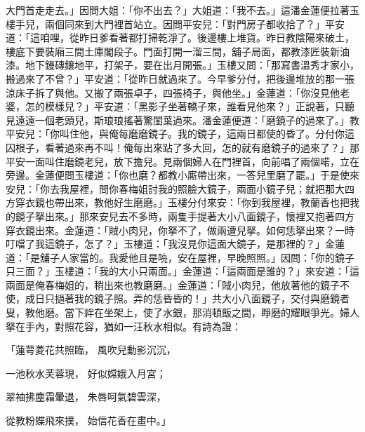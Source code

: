 大門首走走去。」因問大姐：「你不出去？」大姐道：「我不去。」這潘金蓮便拉著玉樓手兒，兩個同來到大門裡首站立。因問平安兒：「對門房子都收拾了？」平安道：「這咱哩，從昨日爹看著都打掃乾淨了。後邊樓上堆貨。昨日教陰陽來破土，樓底下要裝廂三間土庫閣段子。門面打開一溜三間，舖子局面，都教漆匠裝新油漆。地下鏝磚鑲地平，打架子，要在出月開張。」玉樓又問：「那寫書溫秀才家小，搬過來了不曾？」平安道：「從昨日就過來了。今早爹分付，把後邊堆放的那一張涼床子拆了與他。又搬了兩張卓子，四張椅子，與他坐。」金蓮道：「你沒見他老婆，怎的模樣兒？」平安道：「黑影子坐著轎子來，誰看見他來？」正說著，只聽見遠遠一個老頭兒，斯琅琅搖著驚閨葉過來。潘金蓮便道：「磨鏡子的過來了。」教平安兒：「你叫住他，與俺每磨磨鏡子。我的鏡子，這兩日都使的昏了。分付你這囚根子，看著過來再不叫！俺每出來跕了多大回，怎的就有磨鏡子的過來了？」那平安一面叫住磨鏡老兒，放下擔兒。見兩個婦人在門裡首，向前唱了兩個喏，立在旁邊。金蓮便問玉樓道：「你也磨？都教小廝帶出來，一答兒里磨了罷。」于是使來安兒：「你去我屋裡，問你春梅姐討我的照臉大鏡子，兩面小鏡子兒；就把那大四方穿衣鏡也帶出來，教他好生磨磨。」玉樓分付來安：「你到我屋裡，教蘭香也把我的鏡子拏出來。」那來安兒去不多時，兩隻手提著大小八面鏡子，懷裡又抱著四方穿衣鏡出來。金蓮道：「賊小肉兒，你拏不了，做兩遭兒拏。如何恁拏出來？一時叮噹了我這鏡子，怎了？」玉樓道：「我沒見你這面大鏡子，是那裡的？」金蓮道：「是舖子人家當的。我愛他且是喨，安在屋裡，早晚照照。」因問：「你的鏡子只三面？」玉樓道：「我的大小只兩面。」金蓮道：「這兩面是誰的？」來安道：「這兩面是俺春梅姐的，稍出來也教磨磨。」金蓮道：「賊小肉兒，他放著他的鏡子不使，成日只撾著我的鏡子照。弄的恁昏昏的！」共大小八面鏡子，交付與磨鏡者叟，教他磨。當下絆在坐架上，使了水銀，那消頓飯之間，睜磨的耀眼爭光。婦人拏在手內，對照花容，猶如一汪秋水相似。有詩為證：

「蓮萼菱花共照臨，  風吹兒動影沉沉，

一池秋水芙蓉現，  好似嫦娥入月宮；

翠袖拂塵霜暈退，  朱唇呵氣碧雲深，

從教粉蝶飛來撲，  始信花香在畫中。」

